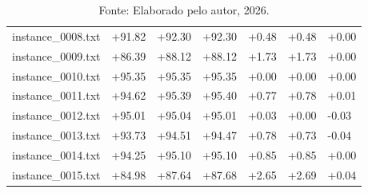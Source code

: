\begin{table}[H]
\begin{minipage}{\textwidth}
{\begin{tabular}{l | l | l | l | l | l | l}
        \rowcolor{gray!20} instance\_0008.txt & \textcolor{green!50!black}{+91.82} & \textcolor{green!50!black}{+92.30} & \textcolor{green!50!black}{+92.30} & \textcolor{green!50!black}{+0.48} & \textcolor{green!50!black}{+0.48} & +0.00 \\
        instance\_0009.txt & \textcolor{green!50!black}{+86.39} & \textcolor{green!50!black}{+88.12} & \textcolor{green!50!black}{+88.12} & \textcolor{green!50!black}{+1.73} & \textcolor{green!50!black}{+1.73} & +0.00 \\
        \rowcolor{gray!20} instance\_0010.txt & \textcolor{green!50!black}{+95.35} & \textcolor{green!50!black}{+95.35} & \textcolor{green!50!black}{+95.35} & +0.00 & +0.00 & +0.00 \\
        instance\_0011.txt & \textcolor{green!50!black}{+94.62} & \textcolor{green!50!black}{+95.39} & \textcolor{green!50!black}{+95.40} & \textcolor{green!50!black}{+0.77} & \textcolor{green!50!black}{+0.78} & \textcolor{green!50!black}{+0.01} \\
        \rowcolor{gray!20} instance\_0012.txt & \textcolor{green!50!black}{+95.01} & \textcolor{green!50!black}{+95.04} & \textcolor{green!50!black}{+95.01} & \textcolor{green!50!black}{+0.03} & +0.00 & \textcolor{red!80!black}{-0.03} \\
        instance\_0013.txt & \textcolor{green!50!black}{+93.73} & \textcolor{green!50!black}{+94.51} & \textcolor{green!50!black}{+94.47} & \textcolor{green!50!black}{+0.78} & \textcolor{green!50!black}{+0.73} & \textcolor{red!80!black}{-0.04} \\
        \rowcolor{gray!20} instance\_0014.txt & \textcolor{green!50!black}{+94.25} & \textcolor{green!50!black}{+95.10} & \textcolor{green!50!black}{+95.10} & \textcolor{green!50!black}{+0.85} & \textcolor{green!50!black}{+0.85} & +0.00 \\
        instance\_0015.txt & \textcolor{green!50!black}{+84.98} & \textcolor{green!50!black}{+87.64} & \textcolor{green!50!black}{+87.68} & \textcolor{green!50!black}{+2.65} & \textcolor{green!50!black}{+2.69} & \textcolor{green!50!black}{+0.04} \\
        \hline
      \end{tabular}
    }
    \caption*{\footnotesize Fonte: Elaborado pelo autor, 2026.}
  \end{minipage}
\end{table}
